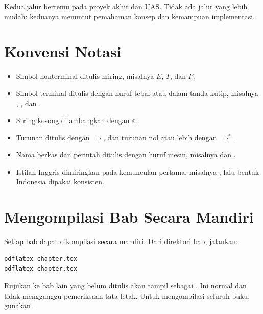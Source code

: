 Kedua jalur bertemu pada proyek akhir dan UAS. Tidak ada jalur yang
lebih mudah: keduanya menuntut pemahaman konsep dan kemampuan
implementasi.

\section*{Konvensi Notasi}

\begin{itemize}[leftmargin=*]
  \item Simbol nonterminal ditulis miring, misalnya \(E\), \(T\),
        dan \(F\).
  \item Simbol terminal ditulis dengan huruf tebal atau dalam tanda
        kutip, misalnya , \code{+}, dan .
  \item String kosong dilambangkan dengan \(\varepsilon\).
  \item Turunan ditulis dengan \(\Rightarrow\), dan turunan nol atau
        lebih dengan \(\Rightarrow^{*}\).
  \item Nama berkas dan perintah ditulis dengan huruf mesin, misalnya
         dan .
  \item Istilah Inggris dimiringkan pada kemunculan pertama, misalnya
        , lalu bentuk Indonesia dipakai konsisten.
\end{itemize}

\section*{Mengompilasi Bab Secara Mandiri}

Setiap bab dapat dikompilasi secara mandiri. Dari direktori bab,
jalankan:
\begin{lstlisting}[language=bash]
pdflatex chapter.tex
pdflatex chapter.tex
\end{lstlisting}
Rujukan ke bab lain yang belum ditulis akan tampil sebagai .
Ini normal dan tidak mengganggu pemeriksaan tata letak. Untuk
mengompilasi seluruh buku, gunakan .
